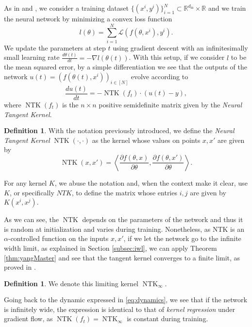 \documentclass[11pt,notitlepage]{article}
\numberwithin{equation}{section}
\def\R{{\mathbb{R}}}
\DeclareMathOperator{\NTK}{NTK}
\theoremstyle{remark}
\theoremstyle{definition}
\newtheorem{definition_body}[theorem]{Definition}
\newcommand{\definition}[1]{
	\theoremstyle{definition}
	\begin{definition_body}
		#1
	\end{definition_body}
	\theoremstyle{plain}
}
\begin{document}
	As in \cite{jacot2018neural} and \cite{arora2019exact}, we consider a training dataset $\{(x^i, y^i)\}_{i=1}^N \subset \R^{d_\text{in}} \times \R$ and we train the neural network by minimizing a convex loss function \[l(\theta) = \sum_{i=1}^N\mathcal{L}(f(\theta, x^i), y^i). \]
	We update the parameters at step $t$ using gradient descent with an infinitesimally small learning rate $\frac{d\theta(t)}{dt} = - \nabla l(\theta(t))$.
	With this setup, if we consider $l$ to be the mean squared error, by a simple differentiation \cite[Lemma 3.1]{arora2019exact} we see that the outputs of the network $u(t) = (f(\theta(t), x^i))_{i\in [N]}$ evolve according to 
	\begin{equation}\label{eq:dynamics}
		\frac{du(t)}{dt} = -\NTK(f_t) \cdot (u(t) - y),
	\end{equation}
	where $\NTK(f_t)$ is the $n \times n$ positive semidefinite matrix given by the \emph{Neural Tangent Kernel}.
	
	\definition{
		With the notation previously introduced, we define the \emph{Neural Tangent Kernel} $\NTK(\cdot, \cdot)$ as the kernel whose values on points $x, x'$ are given by 
		\begin{equation}\label{eq:ntk}
			\NTK(x, x') = \left\langle \frac{\partial f (\theta, x)}{\partial \theta}, \frac{\partial f (\theta, x')}{\partial \theta} \right\rangle. 
		\end{equation}
		
		For any kernel $K$, we abuse the notation and, when the context make it clear, use $K$, or specifically $NTK$, to define the matrix whose entries $i,j$ are given by $K(x^i,x^j)$.
	}
	
	As we can see, the $\NTK$ depends on the parameters of the network and thus it is random at initialization and varies during training.
	Nonetheless, as NTK is an $\alpha$-controlled function on the inputs $x, x'$, if we let the network go to the infinite width limit, as explained in Section \ref{subsec:iwl}, we can apply Theorem \ref{thm:yangMaster} and see that the tangent kernel converges to a finite limit, as proved in \cite{yang2019scaling}.
	
	\definition{We denote this limiting kernel $\NTK_\infty$.}
	
	Going back to the dynamic expressed in \eqref{eq:dynamics}, we see that if the network is infinitely wide, the expression is identical to that of \emph{kernel regression} under gradient flow, as $\NTK(f_t) = \NTK_\infty$ is constant during training.
	
\end{document}
